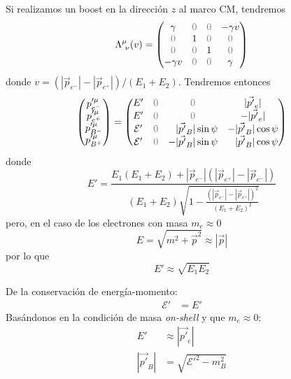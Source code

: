 \documentclass[]{report}
\numberwithin{equation}{section}
\newcommand{\LambdaMuNu}{\indUpDown}
\newcommand{\0}{\textcolor{gray}{0}}
\begin{document}
\begin{enumerate}
	Si realizamos un boost en la dirección \(z\) al marco CM, tendremos
	\begin{equation}
		\LambdaMuNu(v) = \begin{pmatrix}
			\gamma & \0 & \0 & -\gamma v\\
			\0 & 1 & \0 & \0\\
			\0 & \0 & 1 & \0\\
			-\gamma v & \0 & \0 & \gamma
		\end{pmatrix}
	\end{equation}
	donde \(v = (|\vec{p}_{e^{-}}| - |\vec{p}_{e^{+}}|)/(E_{1} + E_{2})\). Tendremos entonces
	\begin{equation}
		\begin{pmatrix}
			p'^{\mu}_{e^{-}}\\
			p'^{\mu}_{e^{+}}\\
			p'^{\mu}_{B^{-}}\\
			p'^{\mu}_{B^{+}}
		\end{pmatrix} = \begin{pmatrix}
			E' 			 & \0 & \0 								& |\vec{p'}_{e}|\\
			E' 			 & \0 & \0 								& -|\vec{p'}_{e}|\\
			\mathcal{E}' & \0 & \hfill|\vec{p'}_{B}|\sin\psi	& -|\vec{p'}_{B}|\cos\psi\\
			\mathcal{E}' & \0 & -|\vec{p'}_{B}|\sin\psi 		& \hfill|\vec{p'}_{B}|\cos\psi
		\end{pmatrix}
	\end{equation}
	donde
	\begin{equation}
		E' = \frac{E_{1} (E_{1}+E_{2})+|\vec{p}_{e^{-}}| (|\vec{p}_{e^{+}}|-|\vec{p}_{e^{-}}|)}{(E_{1}+E_{2}) \sqrt{1-\frac{(|\vec{p}_{e^{-}}|-|\vec{p}_{e^{+}}|)^2}{(E_{1}+E_{2})^2}}}
	\end{equation}
	pero, en el caso de los electrones con masa \(m_{e} \approx 0\)
	\begin{equation*}
		E = \sqrt{m^2 + \vec{p}^2} \approx |\vec{p}|
	\end{equation*}
	por lo que
	\begin{equation}
		E' \approx \sqrt{E_{1} E_{2}}
	\end{equation}
	
	De la conservación de energía-momento:
	\begin{align}
		\mathcal{E}' &= E'
	\end{align}
	Basándonos en la condición  de masa \textit{on-shell} y que \(m_{e} \approx 0\):
	\begin{align}
		E' & \approx |\vec{p'}_{e}|\label{onShell_1}\\
|\vec{p'}_{B}| &= \sqrt{\mathcal{E}'^{2} - m_{B}^2}\label{onShellInv_4}
	\end{align}
	

\end{enumerate}
\end{document}
